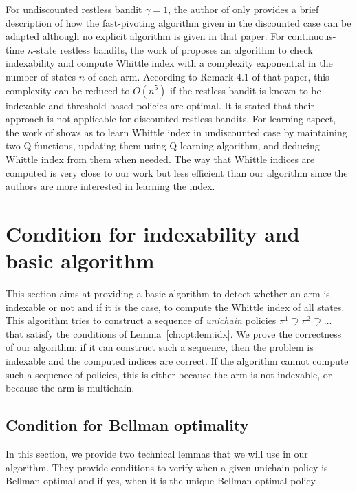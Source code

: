 For undiscounted restless bandit $\gamma=1$, the author of \cite{nino2020fast} only provides a brief description of how the fast-pivoting algorithm given in the discounted case can be adapted although no explicit algorithm is given in that paper.
For continuous-time $n$-state restless bandits, the work of \cite{ayesta2021computation} proposes an algorithm to check indexability and compute Whittle index with a complexity exponential in the number of states $n$ of each arm.
According to Remark 4.1 of that paper, this complexity can be reduced to $O(n^5)$ if the restless bandit is known to be indexable and threshold-based policies are optimal.
It is stated that their approach is not applicable for discounted restless bandits.
For learning aspect, the work of \cite{gibson2021novel} shows as to learn Whittle index in undiscounted case by maintaining two Q-functions, updating them using Q-learning algorithm, and deducing Whittle index from them when needed.
The way that Whittle indices are computed is very close to our work but less efficient than our algorithm since the authors are more interested in learning the index. 


\section{Condition for indexability and basic algorithm}
\label{sec:widx_compute}

This section aims at providing a basic algorithm to detect whether an arm is indexable or not and if it is the case, to compute the Whittle index of all states.
This algorithm tries to construct a sequence of \emph{unichain} policies $\pi^1\supsetneq \pi^2\supsetneq\dots$ that satisfy the conditions of Lemma~\ref{ch:cpt:lem:idx}.
We prove the correctness of our algorithm: if it can construct such a sequence, then the problem is indexable and the computed indices are correct.
If the algorithm cannot compute such a sequence of policies, this is either because the arm is not indexable, or because the arm is multichain.

\subsection{Condition for Bellman optimality}

In this section, we provide two technical lemmas that we will use in our algorithm. %
They provide conditions to verify when a given unichain policy is Bellman optimal and if yes, when it is the unique Bellman optimal policy.

